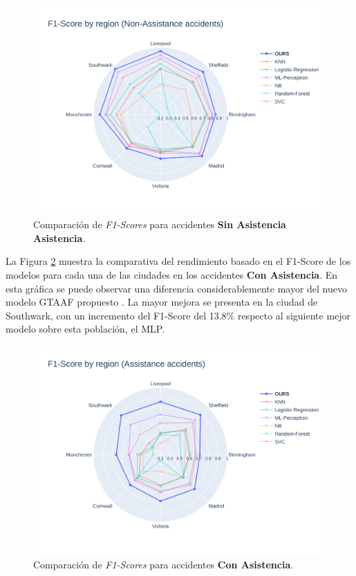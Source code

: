 \documentclass{uathesis-es}
\begin{document}
{		\begin{figure}[H]
			\centering
			\includegraphics[width=150mm]{Figures/Slight.png}
			\caption{Comparación de \textit{F1-Scores} para accidentes \textbf{Sin Asistencia Asistencia}.}
			\label{GlobalSlightF1Score}
		\end{figure}
		
		La Figura \ref{GlobalAssistanceF1Score} muestra la comparativa del rendimiento basado en el F1-Score de los modelos para cada una de las ciudades en los accidentes \textbf{Con Asistencia}. En esta gráfica se puede observar una diferencia considerablemente mayor del nuevo modelo GTAAF propuesto . La mayor mejora se presenta en la ciudad de Southwark, con un incremento del F1-Score del 13.8\% respecto al siguiente mejor modelo sobre esta población, el MLP.
		
		\begin{figure}[H]
			\centering
			\includegraphics[width=150mm]{Figures/Assistance.png}
			\caption{Comparación de \textit{F1-Scores} para accidentes \textbf{Con Asistencia}.}    \label{GlobalAssistanceF1Score}
		\end{figure}
		
}
\end{document}
